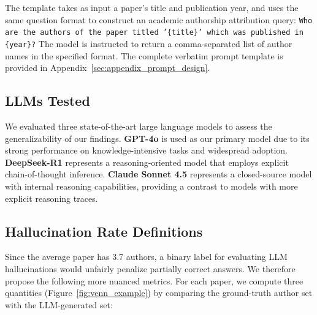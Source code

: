 \documentclass[11pt]{article}
\begin{document}
The template takes as input a paper's title and publication year, and uses the same question format to construct an academic authorship attribution query: \texttt{Who are the authors of the paper titled '\{title\}' which was published in \{year\}?}
The model is instructed to return a comma-separated list of author names in the specified format.
The complete verbatim prompt template is provided in Appendix~\ref{sec:appendix_prompt_design}.

\subsection{LLMs Tested}
\label{sec:llm_config}

We evaluated three state-of-the-art large language models to assess the generalizability of our findings. \textbf{GPT-4o} is used as our primary model due to its strong performance on knowledge-intensive tasks and widespread adoption. \textbf{DeepSeek-R1} represents a reasoning-oriented model that employs explicit chain-of-thought inference. \textbf{Claude Sonnet 4.5} represents a closed-source model with internal reasoning capabilities, providing a contrast to models with more explicit reasoning traces.

\subsection{Hallucination Rate Definitions}
\label{sec:hr_definitions}

Since the average paper has 3.7 authors, a binary label for evaluating LLM hallucinations would unfairly penalize partially correct answers. We therefore propose the following more nuanced metrics. For each paper, we compute three quantities (Figure~\ref{fig:venn_example}) by comparing the ground-truth author set with the LLM-generated set:
\end{document}
